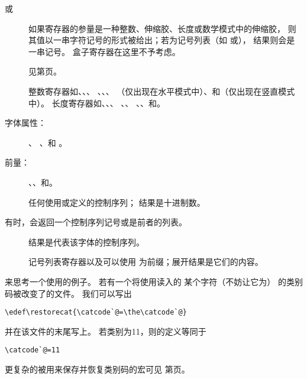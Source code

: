 \documentclass{book}
\begin{document}
\begin{description}\item [或]
如果寄存器的参量是一种整数、伸缩胶、长度或数学模式中的伸缩胶，
则其值以一串字符记号的形式被给出；若为记号列表（如
或），
结果则会是一串记号。
盒子寄存器在这里不予考虑。
\item []
见第\pageref{codename}页。
\item []
整数寄存器如、、、
、、、
（仅出现在水平模式中）、和（仅出现在竖直模式中）。
长度寄存器如、、、
\handbreak {}、、
、、和。
\item [字体属性：]
、
、和
。
\item [前量：]
、、和。
\item []
任何使用或定义的控制序列；
结果是十进制数。
\end{description}
有时，会返回一个控制序列记号或是前者的列表。
\begin{description}\item []
结果是代表该字体的控制序列。
\item []
记号列表寄存器以及可以使用
为前缀；展开结果是它们的内容。
\end{description}

来思考一个使用的例子。
若有一个将使用读入的
某个字符（不妨让它为\texttt{\@}）
的类别码被改变了的文件。
我们可以写出
\begin{verbatim}
\edef\restorecat{\catcode`@=\the\catcode`@}
\end{verbatim}
并在该文件的末尾写上。
若类别为11，则的定义等同于
\begin{verbatim}
\catcode`@=11
\end{verbatim}
更复杂的被用来保存并恢复类别码的宏可见
第\pageref{store:cat}页。
\end{document}

